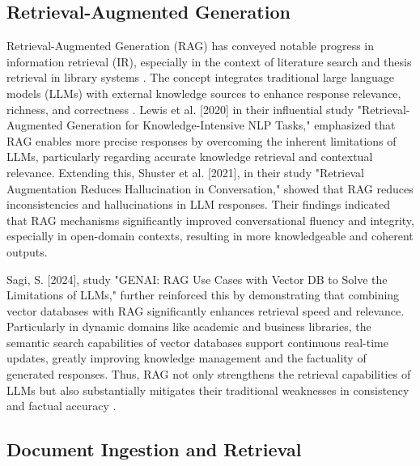\begin{refsection}
\subsection{Retrieval-Augmented Generation}

\hspace{1cm}Retrieval-Augmented Generation (RAG) has conveyed notable progress in information retrieval (IR), especially in the context of literature search and thesis retrieval in library systems \cite{thomo2024pubmed}. The concept integrates traditional large language models (LLMs) with external knowledge sources to enhance response relevance, richness, and correctness \cite{chen2024benchmarking}. Lewis et al. [2020] in their influential study "Retrieval-Augmented Generation for Knowledge-Intensive NLP Tasks," emphasized that RAG enables more precise responses by overcoming the inherent limitations of LLMs, particularly regarding accurate knowledge retrieval and contextual relevance. Extending this, Shuster et al. [2021], in their study "Retrieval Augmentation Reduces Hallucination in Conversation," showed that RAG reduces inconsistencies and hallucinations in LLM responses. Their findings indicated that RAG mechanisms significantly improved conversational fluency and integrity, especially in open-domain contexts, resulting in more knowledgeable and coherent outputs.

\bigbreak
\hspace{0.4cm}Sagi, S. [2024], study "GENAI: RAG Use Cases with Vector DB to Solve the Limitations of LLMs," further reinforced this by demonstrating that combining vector databases with RAG significantly enhances retrieval speed and relevance. Particularly in dynamic domains like academic and business libraries, the semantic search capabilities of vector databases support continuous real-time updates, greatly improving knowledge management and the factuality of generated responses. Thus, RAG not only strengthens the retrieval capabilities of LLMs but also substantially mitigates their traditional weaknesses in consistency and factual accuracy \cite{sagi2024genai}.


\subsection{Document Ingestion and Retrieval}


\end{refsection}
